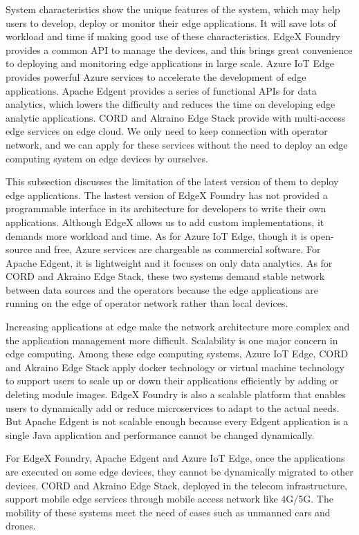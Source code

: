 System characteristics show the unique features of the system, which may help users to develop, deploy or monitor their edge applications. It will save lots of workload and time if making good use of these characteristics. EdgeX Foundry provides a common API to manage the devices, and this brings great convenience to deploying and monitoring edge applications in large scale. Azure IoT Edge provides powerful Azure services to accelerate the development of edge applications. Apache Edgent provides a series of functional APIs for data analytics, which lowers the difficulty and reduces the time on developing edge analytic applications. CORD and Akraino Edge Stack provide with multi-access edge services on edge cloud. We only need to keep connection with operator network, and we can apply for these services without the need to deploy an edge computing system on edge devices by ourselves.

This subsection discusses the limitation of the latest version of them to deploy edge applications. The lastest version of EdgeX Foundry has not provided a programmable interface in its architecture for developers to write their own applications. Although EdgeX allows us to add custom implementations, it demands more workload and time. As for Azure IoT Edge, though it is open-source and free, Azure services are chargeable as commercial software. For Apache Edgent, it is lightweight and it focuses on only data analytics. As for CORD and Akraino Edge Stack, these two systems demand stable network between data sources and the operators because the edge applications are running on the edge of operator network rather than local devices.

Increasing applications at edge make the network architecture more complex and the application management more difficult. Scalability is one major concern in edge computing. Among these edge computing systems, Azure IoT Edge, CORD and Akraino Edge Stack apply docker technology or virtual machine technology to support users to scale up or down their applications efficiently by adding or deleting module images. EdgeX Foundry is also a scalable platform that enables users to dynamically add or reduce microservices to adapt to the actual needs. But Apache Edgent is not scalable enough because every Edgent application is a single Java application and performance cannot be changed dynamically.

For EdgeX Foundry, Apache Edgent and Azure IoT Edge, once the applications are executed on some edge devices, they cannot be dynamically migrated to other devices. CORD and Akraino Edge Stack, deployed in the telecom infrastructure, support mobile edge services through mobile access network like 4G/5G. The mobility of these systems meet the need of cases such as unmanned cars and drones.


